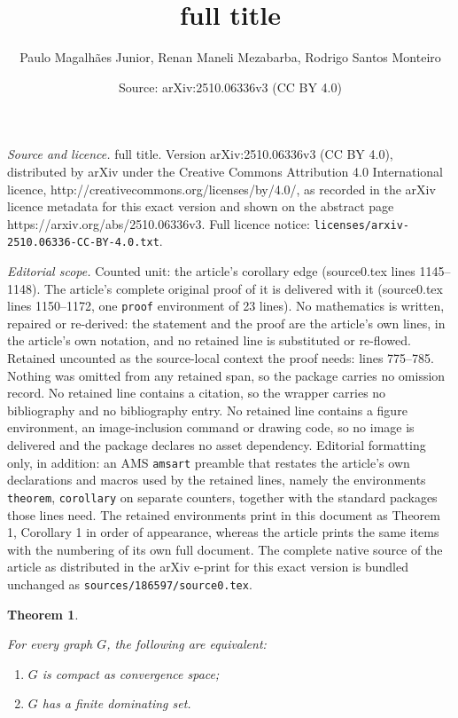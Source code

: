 \documentclass[10pt,a4paper]{amsart}
\title{full title}
\author{Paulo Magalh\~aes Junior, Renan Maneli Mezabarba, Rodrigo Santos Monteiro}
\date{Source: arXiv:2510.06336v3 (CC BY 4.0)}
\newtheorem{theorem}{Theorem}
\begin{document}
\maketitle

\noindent\emph{Source and licence.} full title. Version arXiv:2510.06336v3 (CC BY 4.0), distributed by arXiv under the Creative Commons Attribution 4.0 International licence, http://creativecommons.org/licenses/by/4.0/, as recorded in the arXiv licence metadata for this exact version and shown on the abstract page https://arxiv.org/abs/2510.06336v3. Full licence notice: \texttt{licenses/arxiv-2510.06336-CC-BY-4.0.txt}.\par\smallskip

\noindent\textit{Editorial scope.} Counted unit: the article's corollary edge (source0.tex lines 1145--1148). The article's complete original proof of it is delivered with it (source0.tex lines 1150--1172, one \texttt{proof} environment of 23 lines). No mathematics is written, repaired or re-derived: the statement and the proof are the article's own lines, in the article's own notation, and no retained line is substituted or re-flowed.  Retained uncounted as the source-local context the proof needs: lines 775--785.  Nothing was omitted from any retained span, so the package carries no omission record.  No retained line contains a citation, so the wrapper carries no bibliography and no bibliography entry.  No retained line contains a figure environment, an image-inclusion command or drawing code, so no image is delivered and the package declares no asset dependency.  Editorial formatting only, in addition: an AMS \texttt{amsart} preamble that restates the article's own declarations and macros used by the retained lines, namely the environments \texttt{theorem}, \texttt{corollary} on separate counters, together with the standard packages those lines need.  The retained environments print in this document as Theorem 1, Corollary 1 in order of appearance, whereas the article prints the same items with the numbering of its own full document.  The complete native source of the article as distributed in the arXiv e-print for this exact version is bundled unchanged as \texttt{sources/186597/source0.tex}.
\begin{theorem}
	\label{teocomp2}
	
		For every graph $G$, the following are equivalent:
	\begin{enumerate}
		\item $G$ is compact as convergence space;
		\item  $G$ has a finite dominating set.
	\end{enumerate}


\end{theorem}
\end{document}
